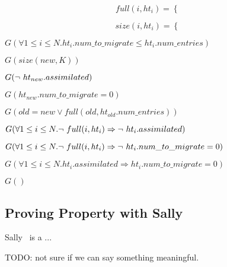   \begin{equation*}
    full(i, ht_i)=\left\{
    \begin{array}{ll}
       & \\
    \end{array}
    \right.
  \end{equation*}

  \begin{equation*}
    size(i, ht_i)=\left\{
    \begin{array}{ll}
       & \\
    \end{array}
    \right.
  \end{equation*}
  

\begin{lemma}
  $G(\forall 1 \leq i \leq N. ht_i.num\_to\_migrate \leq ht_i.num\_entries)$
\end{lemma}  

\begin{lemma}
  $G(size(new,K))$
\end{lemma}  

\begin{lemma}
  $G(\mbox{$\neg\ ht_{new}.assimilated$})$
\end{lemma}  

\begin{lemma}
  $G(ht_{new}.num\_to\_migrate = 0)$
\end{lemma}  

\begin{lemma}
  $G(old = new \vee full(old, ht_{old}.num\_entries))$
\end{lemma}  

\begin{lemma}
  $G(\forall 1 \leq i \leq N. \mbox{$\neg\ full(i,ht_{i})$} \Rightarrow \mbox{$\neg\ ht_{i}.assimilated$})$
\end{lemma}  

\begin{lemma}
  $G(\forall 1 \leq i \leq N. \mbox{$\neg\ full(i,ht_{i})$} \Rightarrow \mbox{$\neg\ ht_{i}.num\_to\_migrate = 0$})$
\end{lemma}  

\begin{lemma}
  $G(\forall 1 \leq i \leq N. ht_{i}.assimilated \Rightarrow ht_{i}.num\_to\_migrate = 0)$
\end{lemma}  

\begin{lemma}
  $G()$
\end{lemma}  



\subsection{Proving Property with Sally}

Sally~\cite{sally} is a ...

TODO: not sure if we can say something meaningful.


